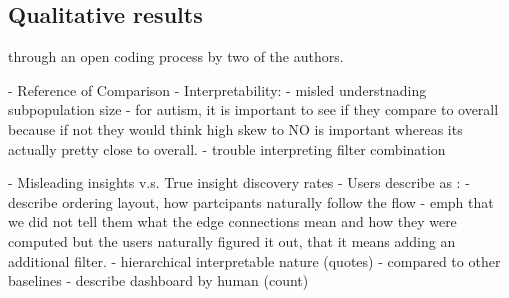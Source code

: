 \subsection{Qualitative results}
through an open coding process by two of the authors.


- Reference of Comparison
- Interpretability: 
	- misled understnading subpopulation size
		- for autism, it is important to see if they compare to overall because if not they would think high skew to NO is important whereas its actually pretty close to overall.
	- trouble interpreting filter combination

- Misleading insights v.s. True insight discovery rates 
- Users describe \system as : 
	- describe ordering layout, how partcipants naturally follow the flow
	- emph that we did not tell them what the edge connections mean and how they were computed but the users naturally figured it out, that it means adding an additional filter.
	- hierarchical interpretable nature (quotes)
	- compared to other baselines 
	- describe dashboard by human (count)


